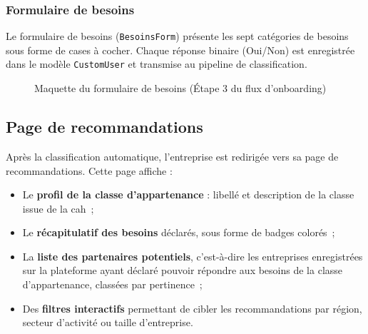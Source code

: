 \documentclass[12pt, a4paper, oneside]{report}
\begin{document}
\subsubsection{Formulaire de besoins}

Le formulaire de besoins (\texttt{BesoinsForm}) présente les sept catégories de besoins sous forme de cases à cocher. Chaque réponse binaire (Oui/Non) est enregistrée dans le modèle \texttt{CustomUser} et transmise au pipeline de classification.

\begin{figure}[H]
  \centering
  \caption{Maquette du formulaire de besoins (Étape 3 du flux d'onboarding)}
  \label{fig:formulaire_besoins}
\end{figure}

\subsection{Page de recommandations}

Après la classification automatique, l'entreprise est redirigée vers sa page de recommandations. Cette page affiche :

\begin{itemize}
  \item Le \textbf{profil de la classe d'appartenance} : libellé et description de la classe issue de la \gls{cah}~;
  \item Le \textbf{récapitulatif des besoins} déclarés, sous forme de badges colorés~;
  \item La \textbf{liste des partenaires potentiels}, c'est-à-dire les entreprises enregistrées sur la plateforme ayant déclaré pouvoir répondre aux besoins de la classe d'appartenance, classées par pertinence~;
  \item Des \textbf{filtres interactifs} permettant de cibler les recommandations par région, secteur d'activité ou taille d'entreprise.
\end{itemize}
\end{document}
